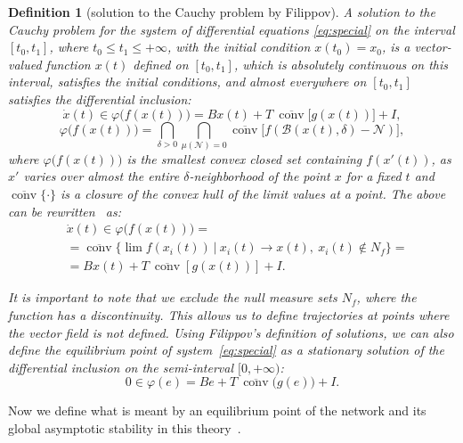 \documentclass[journal]{IEEEtran}
\newtheorem{definition}{Definition}
\begin{document}
\smallskip 
\begin{definition}[solution to the Cauchy problem by Filippov]\label{fillipovsol}
\textit{A solution to the Cauchy problem} for the system of differential equations \eqref{eq:special} on the interval $[t_0,t_1]$, where $t_0\leqslant t_1 \leqslant +\infty$, with the initial condition $x(t_0) = x_0$, is a vector-valued function $x(t)$ defined on $[t_0,t_1]$, which is absolutely continuous on this interval, satisfies the initial conditions, and almost everywhere on $[t_0,t_1]$ satisfies the differential inclusion:
\[  
    \dot x (t)\in \varphi\big(f(x(t))\big) = Bx(t)+T~\overline{\operatorname{conv}}\big[g(x(t))\big]+I,
    \label{1.2}
\]
\[  
    \varphi\big(f(x(t))\big)= \bigcap\limits_{\delta>0}\bigcap\limits_{\mu(\mathcal{N})=0}\overline{\operatorname{conv}}\big[f(\mathcal{B}(x(t),\delta) - \mathcal{N})\big], 
\]
where $\varphi\big(f(x(t))\big)$ is the smallest convex 
closed set containing $f(x'(t))$, as $x'$ 
varies over almost the entire $\delta$-neighborhood 
of the point $x$ for a fixed $t$ and 
$\overline{\operatorname{conv}}\{\cdot\}$ is a closure of the convex hull of the limit values at a point. 
The above can be rewritten~\cite{p9} as:
\begin{equation}\label{eq:special_conv}
\begin{aligned}
&\dot x (t)\in \varphi\big(f(x(t))\big) = \\
	&=\overline{\operatorname{conv}}\big\{\lim f(x_i(t)) ~|~x_i(t) \to x(t),~x_i(t)\notin N_f\big\} = \\
	&=Bx(t)+T~\overline{\operatorname{conv}}[g(x(t))]+I. 
\end{aligned}
\end{equation}

 It is important to note that we exclude the null measure sets $N_f$,
 where the function has a discontinuity.
 This allows us to define trajectories at points where
 the vector field is not defined.
 Using Filippov's definition of solutions, we can also define the \emph{equilibrium point}
 of system~\eqref{eq:special} as a stationary solution
 of the differential inclusion on the semi-interval $[0,+\infty)$:
 \begin{equation*} 0\in\varphi(e) =
 Be+T~\overline{\operatorname{conv}}\big(g(e)\big)+I.
 \end{equation*}    
\end{definition}

Now we define what is meant by an equilibrium point of the network and its global asymptotic stability in this theory~\cite{p1}.
\end{document}
